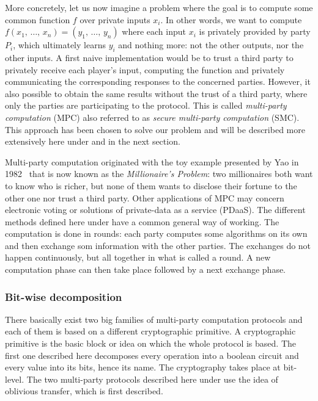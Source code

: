 More concretely, let us now imagine a problem where the goal is to compute some common function $f$ over private inputs $x_i$. In other words, we want to compute $f\left(x_1, \, \ldots, \, x_n\right) = \left( y_1, \, \ldots , \, y_n\right)$ where each input $x_i$ is privately provided by party $P_i$, which ultimately learns $y_i$ and nothing more: not the other outputs, nor the other inputs. A first naive implementation would be to trust a third party to privately receive each player's input, computing the function and privately communicating the corresponding responses to the concerned parties. However, it also possible to obtain the same results without the trust of a third party, where only the parties are participating to the protocol. This is called \emph{multi-party computation} (MPC) also referred to as \emph{secure multi-party computation} (SMC). This approach has been chosen to solve our problem and will be described more extensively here under and in the next section.

Multi-party computation originated with the toy example presented by Yao in 1982~\cite{Yao1982ProtocolsComputations} that is now known as the \emph{Millionaire's Problem}: two millionaires both want to know who is richer, but none of them wants to disclose their fortune to the other one nor trust a third party. Other applications of MPC may concern electronic voting or solutions of private-data as a service (PDaaS). The different methods defined here under have a common general way of working. The computation is done in rounds: each party computes some algorithms on its own and then exchange som information with the other parties. The exchanges do not happen continuously, but all together in what is called a round. A new computation phase can then take place followed by a next exchange phase.


\subsubsection{Bit-wise decomposition}
There basically exist two big families of multi-party computation protocols and each of them is based on a different cryptographic primitive. A cryptographic primitive is the basic block or idea on which the whole protocol is based. The first one described here decomposes every operation into a boolean circuit and every value into its bits, hence its name. The cryptography takes place at bit-level. The two multi-party protocols described here under use the idea of oblivious transfer, which is first described.

